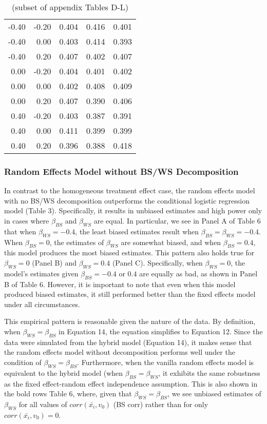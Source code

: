 \documentclass{article}
\begin{document}
\begin{table}[ht]
\begin{tabular}{|r r || r r r |}
            \hline
            -0.40	&-0.20	&0.404	&0.416	&0.401 \\
            -0.40	&0.00	&0.403	&0.414	&0.393 \\
            -0.40	&0.20	&0.407	&0.402	&0.407 \\
            0.00	&-0.20	&0.404	&0.401	&0.402 \\
            0.00	&0.00	&0.402	&0.408	&0.409 \\
            0.00	&0.20	&0.407	&0.390	&0.406 \\
            0.40	&-0.20	&0.403	&0.387	&0.391 \\
            0.40	&0.00	&0.411	&0.399	&0.399 \\
            0.40	&0.20	&0.396	&0.388	&0.418 \\
            \hline
        \end{tabular}
    \caption*{(subset of appendix Tables D-L)}
    \end{table}
    


        \subsubsection{Random Effects Model without BS/WS Decomposition}        
        In contrast to the homogeneous treatment effect case, the random effects model with no BS/WS decomposition outperforms the conditional logistic regression model (Table 3). Specifically, it results in unbiased estimates and high power only in cases where $\beta_{BS}$ and $\beta_{WS}$ are equal. In particular, we see in Panel A of Table 6 that when $\beta_{WS} = -0.4$, the least biased estimates result when $\beta_{BS} = \beta_{WS} = -0.4$. When $\beta_{BS} = 0$, the estimates of $\beta_{WS}$ are somewhat biased, and when $\beta_{BS} = 0.4$, this model produces the most biased estimates. This pattern also holds true for $\beta_{WS} = 0$ (Panel B) and $\beta_{WS} = 0.4$ (Panel C). Specifically, when $\beta_{WS} = 0$, the model's estimates given $\beta_{BS} = -0.4$ or $0.4$ are equally as bad, as shown in Panel B of Table 6. However, it is important to note that even when this model produced biased estimates, it still performed better than the fixed effects model under all circumstances. 
        
        This empirical pattern is reasonable given the nature of the data. By definition, when $\beta_{WS} = \beta_{BS}$ in Equation 14, the equation simplifies to Equation 12. Since the data were simulated from the hybrid model (Equation 14), it makes sense that the random effects model without decomposition performs well under the condition of $\beta_{WS} = \beta_{BS}$. Furthermore, when the vanilla random effects model is equivalent to the hybrid model (when $\beta_{BS} = \beta_{WS}$, it exhibits the same robustness as the fixed effect-random effect independence assumption. This is also shown in the bold rows Table 6, where, given that $\beta_{WS} = \beta_{BS}$, we see unbiased estimates of $\beta_{WS}$ for all values of $corr(\bar{x_i},v_0)$ (BS corr) rather than for only $corr(\bar{x_i},v_0) = 0$.
        
\end{document}
